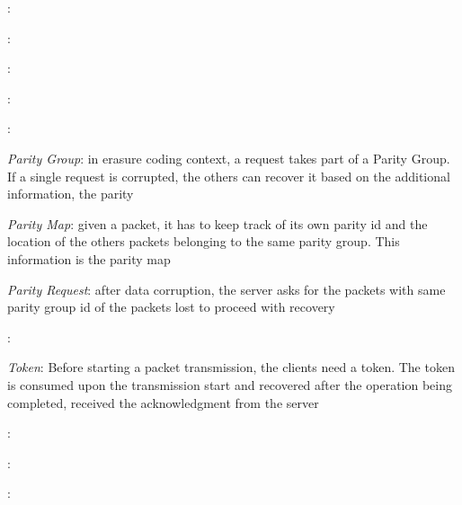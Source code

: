 \textit{}:
\vspace{10pt}

\textit{}:
\vspace{10pt}

\textit{}:
\vspace{10pt}

\textit{}:
\vspace{10pt}

\textit{}:
\vspace{10pt}

\textit{Parity Group}: in erasure coding context, a request takes part of a
Parity Group. If a single request is corrupted, the others can recover it based
on the additional information, the parity
\vspace{10pt}

\textit{Parity Map}: given a packet, it has to keep track of its own parity id
and the location of the others packets belonging to the same parity group. This
information is the parity map
\vspace{10pt}

\textit{Parity Request}: after data corruption, the server asks for the packets
with same parity group id of the packets lost to proceed with recovery
\vspace{10pt}

\textit{}:
\vspace{10pt}

\textit{Token}: Before starting a packet transmission, the clients need a token.
The token is consumed upon the transmission start and recovered after the
operation being completed, received the acknowledgment from the server
\vspace{10pt} 

\textit{}:
\vspace{10pt}

\textit{}:
\vspace{10pt}

\textit{}:
\vspace{10pt}


